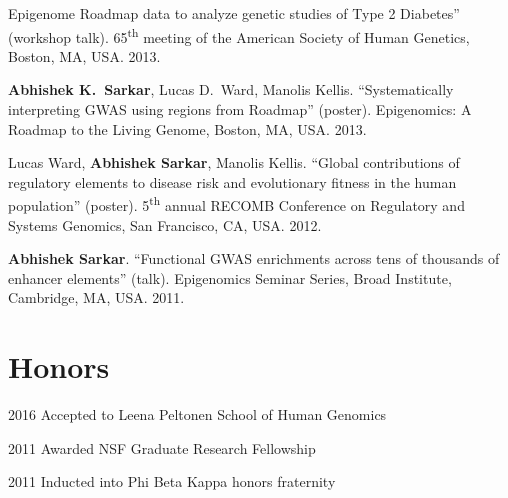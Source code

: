 \documentclass{article}
\begin{document}
\begin{henum}
  Epigenome Roadmap data to analyze genetic studies of Type 2 Diabetes''
  (workshop talk). 65\textsuperscript{th} meeting of the American Society of
  Human Genetics, Boston, MA, USA. 2013.
\item \textbf{Abhishek K.\ Sarkar}, Lucas D.\ Ward, Manolis
  Kellis. ``Systematically interpreting GWAS using regions from Roadmap''
  (poster). Epigenomics: A Roadmap to the Living Genome, Boston, MA, USA. 2013.
\item Lucas Ward, \textbf{Abhishek Sarkar}, Manolis Kellis. ``Global
  contributions of regulatory elements to disease risk and evolutionary fitness
  in the human population'' (poster). 5\textsuperscript{th} annual RECOMB
  Conference on Regulatory and Systems Genomics, San Francisco, CA, USA. 2012.
\item \textbf{Abhishek Sarkar}. ``Functional GWAS enrichments across tens of
  thousands of enhancer elements'' (talk). Epigenomics Seminar Series, Broad
  Institute, Cambridge, MA, USA. 2011.
\end{henum}

\section*{Honors}
\begin{hdesc}
\item[2016] Accepted to Leena Peltonen School of Human Genomics
\item[2011] Awarded NSF Graduate Research Fellowship
\item[2011] Inducted into Phi Beta Kappa honors fraternity
\end{hdesc}
\end{document}
